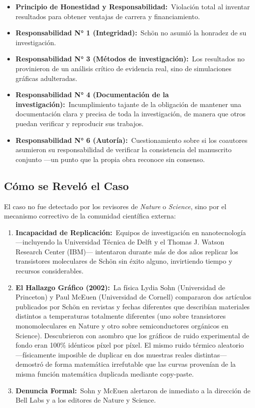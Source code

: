\documentclass[12pt,a4paper]{article}
\newcommand{\itemlabel}[3]{\textbf{#1#2}~#3}
\begin{document}
\begin{itemize}
\item \itemlabel{Principio de Honestidad y Responsabilidad}{:}{Violación total al inventar resultados para obtener ventajas de carrera y financiamiento.}
\item \itemlabel{Responsabilidad N° 1 (Integridad)}{:}{Schön no asumió la honradez de su investigación.}
\item \itemlabel{Responsabilidad N° 3 (Métodos de investigación)}{:}{Los resultados no provinieron de un análisis crítico de evidencia real, sino de simulaciones gráficas adulteradas.}
\item \itemlabel{Responsabilidad N° 4 (Documentación de la investigación)}{:}{Incumplimiento tajante de la obligación de \textquotedbl{}mantener una documentación clara y precisa de toda la investigación, de manera que otros puedan verificar y reproducir sus trabajos\textquotedbl{}.}
\item \itemlabel{Responsabilidad N° 6 (Autoría)}{:}{Cuestionamiento sobre si los coautores asumieron su responsabilidad de verificar la consistencia del manuscrito conjunto —un punto que la propia obra reconoce sin consenso.}
\end{itemize}
\subsection{Cómo se Reveló el Caso}
El caso no fue detectado por los revisores de \textit{Nature} o \textit{Science}, sino por el mecanismo correctivo de la comunidad científica externa:
\begin{enumerate}
\item \itemlabel{Incapacidad de Replicación}{:}{Equipos de investigación en nanotecnología —incluyendo la Universidad Técnica de Delft y el Thomas J. Watson Research Center (IBM)— intentaron durante más de dos años replicar los transistores moleculares de Schön sin éxito alguno, invirtiendo tiempo y recursos considerables.}
\item \itemlabel{El Hallazgo Gráfico (2002)}{:}{La física Lydia Sohn (Universidad de Princeton) y Paul McEuen (Universidad de Cornell) compararon dos artículos publicados por Schön en revistas y fechas diferentes que describían materiales distintos a temperaturas totalmente diferentes (uno sobre transistores monomoleculares en Nature y otro sobre semiconductores orgánicos en Science). Descubrieron con asombro que los gráficos de ruido experimental de fondo eran 100\% idénticos píxel por píxel. El mismo ruido térmico aleatorio —físicamente imposible de duplicar en dos muestras reales distintas— demostró de forma matemática irrefutable que las curvas provenían de la misma función matemática duplicada mediante copy-paste.}
\item \itemlabel{Denuncia Formal}{:}{Sohn y McEuen alertaron de inmediato a la dirección de Bell Labs y a los editores de Nature y Science.}
\end{enumerate}
\end{document}
